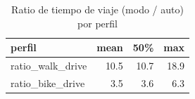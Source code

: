 \begin{table}
\caption{Ratio de tiempo de viaje (modo / auto) por perfil}
\label{tab:mode_comparison}
\begin{tabular}{lrrr}
\toprule
perfil & mean & 50\% & max \\
\midrule
ratio\_walk\_drive & 10.5 & 10.7 & 18.9 \\
ratio\_bike\_drive & 3.5 & 3.6 & 6.3 \\
\bottomrule
\end{tabular}
\end{table}
